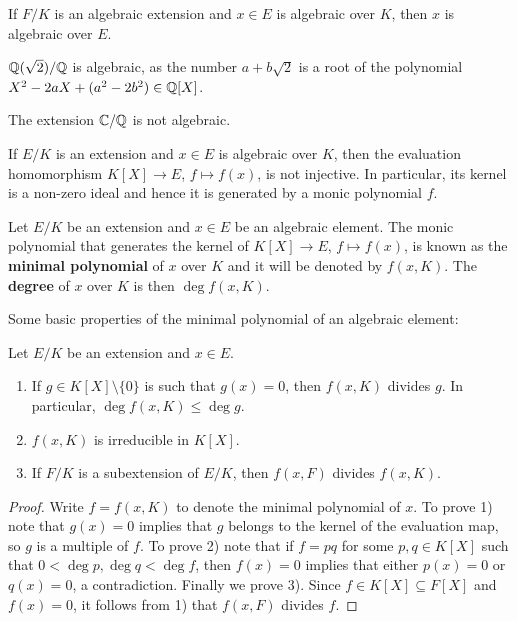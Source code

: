 If $F/K$ is an algebraic extension and $x\in E$ is algebraic
over $K$, then $x$ is algebraic over $E$. 

\begin{example}
	$\mathbb{Q}(\sqrt{2})/\mathbb{Q}$ is algebraic, as the number
	$a+b\sqrt{2}$ is a root of the polynomial
	$X^2-2aX+(a^2-2b^2)\in\mathbb{Q}[X]$. 
\end{example}

The extension $\mathbb{C}/\mathbb{Q}$ is not algebraic. 

If $E/K$ is an extension and $x\in E$ is algebraic
over $K$, then the evaluation homomorphism 
$K[X]\to E$, $f\mapsto f(x)$, is not injective. In particular,
its kernel is a non-zero ideal and hence 
it is generated by a monic polynomial $f$. 

\begin{definition}
	Let $E/K$ be an extension and $x\in E$ be an algebraic element.  The monic
	polynomial that generates the kernel of $K[X]\to E$, $f\mapsto f(x)$, is
	known as the \textbf{minimal polynomial} of $x$ over $K$ and it will be
	denoted by $f(x,K)$. The \textbf{degree} of $x$ over $K$ is then $\deg
	f(x,K)$. 
\end{definition}

Some basic properties of the minimal polynomial of an algebraic element:

\begin{proposition}
	Let $E/K$ be an extension and $x\in E$. 
	\begin{enumerate}
		\item If $g\in K[X]\setminus\{0\}$ is such that $g(x)=0$, then $f(x,K)$ divides $g$. In particular, 
		$\deg f(x,K)\leq\deg g$. 
		\item $f(x,K)$ is irreducible in $K[X]$.
		\item If $F/K$ is a subextension of $E/K$, then $f(x,F)$ divides
			$f(x,K)$. 
	\end{enumerate}
\end{proposition}

\begin{proof}
	Write $f=f(x,K)$ to denote the minimal polynomial of $x$. 
	To prove 1) note that $g(x)=0$ implies that	$g$ belongs to the kernel of
	the evaluation map, so $g$ is a multiple of $f$. To prove 2) 
	note that if $f=pq$ for some $p,q\in K[X]$ such that
	$0<\deg p,\deg q<\deg f$, then $f(x)=0$ implies that 
	either $p(x)=0$ or $q(x)=0$, a
	contradiction. Finally we prove 3). Since $f\in K[X]\subseteq F[X]$ 
	and $f(x)=0$, it follows from 1) that $f(x,F)$ divides $f$. 
\end{proof}

